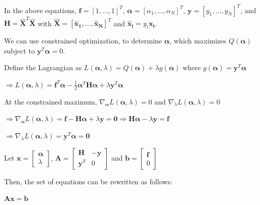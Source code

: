 \documentclass[fleqn]{article}
\begin{document}
\begin{enumerate}
\begin{enumerate}
		In the above equations, $\mathbf{f} = [1, ..., 1]^T$, $\boldsymbol{\alpha} = [\alpha_1, ..., \alpha_N]^T$, \newline $\mathbf{y} = [y_1,...,y_N]^T$, and $\mathbf{H} = \mathbf{\hat{X}}^T\mathbf{\hat{X}}$ with $\mathbf{\hat{X}} = [\mathbf{\hat{x}_1}, ..., \mathbf{\hat{x}_N}]^T$ \newline and $\mathbf{\hat{x}_i} = y_i\mathbf{x_i}$.

		We can use constrained optimization, to determine $\boldsymbol{\alpha}$, which \newline maximizes $Q(\boldsymbol{\alpha})$ subject to $\mathbf{y}^T\boldsymbol{\alpha} = 0$.
		
		Define the Lagrangian as $L(\boldsymbol{\alpha},\lambda) = Q(\boldsymbol{\alpha}) + \lambda g(\boldsymbol{\alpha})$ where $g(\boldsymbol{\alpha}) = \mathbf{y}^T\boldsymbol{\alpha}$
		
		$\Rightarrow L(\boldsymbol{\alpha},\lambda) = \mathbf{f}^T\boldsymbol{\alpha} - \frac{1}{2}\boldsymbol{\alpha}^T\mathbf{H}\boldsymbol{\alpha} + \lambda\mathbf{y}^T\boldsymbol{\alpha}$
		
		At the constrained maximum, $\nabla_{\boldsymbol{\alpha}}L(\boldsymbol{\alpha},\lambda) = 0$ and $\nabla_{\lambda}L(\boldsymbol{\alpha},\lambda) = 0$ 
		
		$\Rightarrow \nabla_{\boldsymbol{\alpha}}L(\boldsymbol{\alpha},\lambda) = \mathbf{f} - \mathbf{H}\boldsymbol{\alpha} + \lambda\mathbf{y} = \mathbf{0} \Rightarrow \mathbf{H}\boldsymbol{\alpha} - \lambda\mathbf{y} = \mathbf{f}$
		
		$\Rightarrow \nabla_{\lambda}L(\boldsymbol{\alpha},\lambda) = \mathbf{y}^T\boldsymbol{\alpha} = \mathbf{0}$
		
		Let $\mathbf{x} = \begin{bmatrix} \boldsymbol{\alpha}\\ \lambda \end{bmatrix}$, $\mathbf{A} = \begin{bmatrix} \mathbf{H} & -\mathbf{y}\\ \mathbf{y}^T & 0 \end{bmatrix}$ and $\mathbf{b} = \begin{bmatrix} \mathbf{f} \\ 0\end{bmatrix}$
		
		Then, the set of equations can be rewritten as follows:
		
		$\mathbf{A}\mathbf{x} = \mathbf{b}$
		

\end{enumerate}
\end{enumerate}
\end{document}

